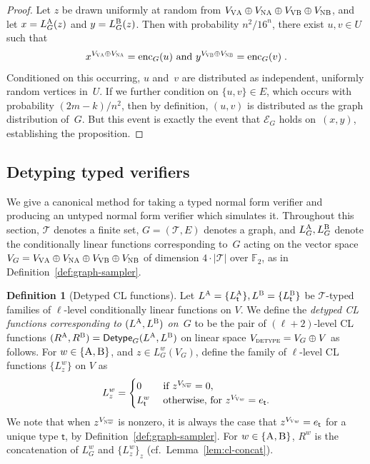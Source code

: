 \documentclass[11pt]{article}
\theoremstyle{definition}
\newtheorem{definition}[theorem]{Definition}
\newcommand{\F}{\ensuremath{\mathbb{F}}}
\newcommand{\type}{\mathcal{T}}
\newcommand{\gamestyle}[1]{\ensuremath{\textsc{#1}}\xspace}
\newcommand{\labelstyle}[1]{\ensuremath{\textsc{#1}}\xspace}
\newcommand{\vertex}[1]{\labelstyle{V#1}}
\newcommand{\edge}[1]{\labelstyle{N#1}}
\newcommand{\tvarstyle}[1]{\mathsf{#1}}
\newcommand{\tvar}{\ensuremath{\tvarstyle{t}}}
\newcommand{\alice}{\labelstyle{A}}
\newcommand{\bob}{\labelstyle{B}}
\newcommand{\tmstyle}[1]{\ensuremath{\mathsf{#1}}}
\newcommand{\detype}{\tmstyle{Detype}}
\begin{document}
\begin{proof}
  Let $z$ be drawn uniformly at random from $V_{\vertex{\alice}}\oplus
  V_{\edge{\alice}}\oplus V_{\vertex{\bob}} \oplus V_{\edge{\bob}}$, and let $x
  = L^\alice_G(z)$ and $y = L^\bob_G(z)$.
  Then with probability $n^2/16^n$, there exist $u, v \in U$ such that
  \begin{equation*}
    \text{$x^{V_{\vertex{\alice}} \oplus V_{\edge{\alice}}} = \mathrm{enc}_G(u)$
      and $y^{V_{\vertex{\bob}} \oplus V_{\edge{\bob}}} = \mathrm{enc}_G(v)$}\;.
  \end{equation*}
  Conditioned on this occurring, $u$ and~$v$ are distributed as independent,
  uniformly random vertices in~$U$.
  If we further condition on $\{u, v\} \in E$, which occurs with probability
  $(2m-k)/n^2$, then by definition, $(u, v)$ is distributed as the graph
  distribution of~$G$.
  But this event is exactly the event that $\mathcal{E}_G$ holds on~$(x, y)$,
  establishing the proposition.
\end{proof}

\subsection{Detyping typed verifiers}
\label{sec:detype}  

We give a canonical method for taking a typed normal form verifier and producing
an untyped normal form verifier which simulates it.
Throughout this section, $\type$ denotes a finite set, $G = (\type, E)$ denotes
a graph, and $L_G^\alice, L_G^\bob$ denote the conditionally linear functions
corresponding to~$G$ acting on the vector space $V_G = V_{\vertex{\alice}}
\oplus V_{\edge{\alice}} \oplus V_{\vertex{\bob}} \oplus V_{\edge{\bob}}$ of
dimension $4\cdot |\type|$ over $\F_2$, as in
Definition~\ref{def:graph-sampler}.

\begin{definition}[Detyped CL functions]
  \label{def:detyped-CL}
  Let $L^\alice = \{L^{\alice}_{\tvar}\}, L^\bob = \{L^{\bob}_{\tvar}\}$ be
  $\type$-typed families of $\ell$-level conditionally linear functions on $V$.
  We define the \emph{detyped CL functions corresponding to $(L^\alice, L^\bob)$
    on~$G$} to be the pair of $(\ell+2)$-level CL functions $(R^\alice, R^\bob)
  = \detype_G(L^\alice, L^\bob)$ on linear space $V_{\gamestyle{detype}} = V_G
  \oplus V$ as follows.
  For $w \in \{\alice, \bob\}$, and $z \in L^w_G (V_G)$, define the family of
  $\ell$-level CL functions $\{L^w_z\}$ on $V$ as
  \begin{equation*}
    L^w_z =
    \begin{cases}
      0 & \text{ if } z^{V_{\edge{}\overline{w}}} = 0,\\
      L^w_\tvar & \text { otherwise, for } z^{V_{\vertex{}w}} = e_\tvar.
    \end{cases}
  \end{equation*}
  We note that when $z^{V_{\edge{}\overline{w}}}$ is nonzero, it is always the
  case that $z^{V_{\vertex{}w}} = e_\tvar$ for a unique type $\tvar$, by
  Definition~\ref{def:graph-sampler}.
  For $w\in \{\alice, \bob\}$, $R^w$ is the concatenation of $L^w_G$ and
  $\{L^w_z\}_z$ (cf.\ Lemma~\ref{lem:cl-concat}).
\end{definition}
\end{document}
